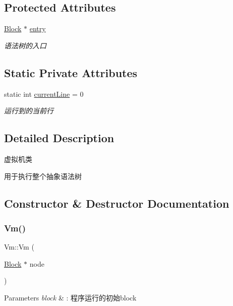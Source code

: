 \subsection*{Protected Attributes}
\begin{DoxyCompactItemize}
\item 
\hyperlink{class_block}{Block} $\ast$ \hyperlink{class_vm_ab5aae972ea15ddfd01362e27ed797a51}{entry}
\begin{DoxyCompactList}\small\item\em 语法树的入口 \end{DoxyCompactList}\end{DoxyCompactItemize}
\subsection*{Static Private Attributes}
\begin{DoxyCompactItemize}
\item 
static int \hyperlink{class_vm_acfa435ede93d1ba8fe2250fd3469de15}{current\+Line} = 0
\begin{DoxyCompactList}\small\item\em 运行到的当前行 \end{DoxyCompactList}\end{DoxyCompactItemize}


\subsection{Detailed Description}
虚拟机类 

用于执行整个抽象语法树 

\subsection{Constructor \& Destructor Documentation}
\mbox{\label{class_vm_a4a37106b5b5b9382baa79dea901db8ba}} 
\subsubsection{\texorpdfstring{Vm()}{Vm()}}
{\footnotesize\ttfamily Vm\+::\+Vm (\begin{DoxyParamCaption}\item[{\hyperlink{class_block}{Block} $\ast$}]{node }\end{DoxyParamCaption})}


\begin{DoxyParams}{Parameters}
{\em block} & \+: 程序运行的初始block \\
\hline
\end{DoxyParams}


